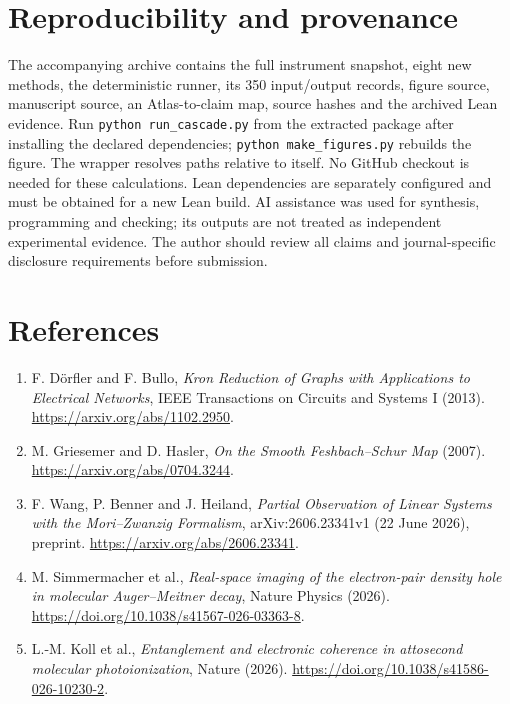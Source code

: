 \documentclass[11pt]{article}
\begin{document}
\section*{Reproducibility and provenance}
The accompanying archive contains the full instrument snapshot, eight new methods, the deterministic runner, its 350 input/output records, figure source, manuscript source, an Atlas-to-claim map, source hashes and the archived Lean evidence. Run \texttt{python run\_cascade.py} from the extracted package after installing the declared dependencies; \texttt{python make\_figures.py} rebuilds the figure. The wrapper resolves paths relative to itself. No GitHub checkout is needed for these calculations. Lean dependencies are separately configured and must be obtained for a new Lean build. AI assistance was used for synthesis, programming and checking; its outputs are not treated as independent experimental evidence. The author should review all claims and journal-specific disclosure requirements before submission.

\section*{References}
\begin{enumerate}
\item F. D\"orfler and F. Bullo, \emph{Kron Reduction of Graphs with Applications to Electrical Networks}, IEEE Transactions on Circuits and Systems I (2013). \url{https://arxiv.org/abs/1102.2950}.
\item M. Griesemer and D. Hasler, \emph{On the Smooth Feshbach--Schur Map} (2007). \url{https://arxiv.org/abs/0704.3244}.
\item F. Wang, P. Benner and J. Heiland, \emph{Partial Observation of Linear Systems with the Mori--Zwanzig Formalism}, arXiv:2606.23341v1 (22 June 2026), preprint. \url{https://arxiv.org/abs/2606.23341}.
\item M. Simmermacher et al., \emph{Real-space imaging of the electron-pair density hole in molecular Auger--Meitner decay}, Nature Physics (2026). \url{https://doi.org/10.1038/s41567-026-03363-8}.
\item L.-M. Koll et al., \emph{Entanglement and electronic coherence in attosecond molecular photoionization}, Nature (2026). \url{https://doi.org/10.1038/s41586-026-10230-2}.
\end{enumerate}
\end{document}
